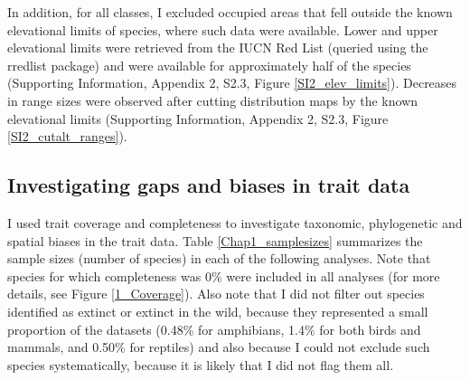 In addition, for all classes, I excluded occupied areas that fell outside the known elevational limits of species, where such data were available. Lower and upper elevational limits were retrieved from the IUCN Red List (queried using the rredlist package) and were available for approximately half of the species (Supporting Information, Appendix 2, S2.3, Figure \ref{SI2_elev_limits}). Decreases in range sizes were observed after cutting distribution maps by the known elevational limits (Supporting Information, Appendix 2, S2.3, Figure \ref{SI2_cutalt_ranges}).

\subsection{Investigating gaps and biases in trait data}

I used trait coverage and completeness to investigate taxonomic, phylogenetic and spatial biases in the trait data. Table \ref{Chap1_samplesizes} summarizes the sample sizes (number of species) in each of the following analyses. Note that species for which completeness was 0\% were included in all analyses (for more details, see Figure \ref{1_Coverage}). Also note that I did not filter out species identified as extinct or extinct in the wild, because they represented a small proportion of the datasets (0.48\% for amphibians, 1.4\% for both birds and mammals, and 0.50\% for reptiles) and also because I could not exclude such species systematically, because it is likely that I did not flag them all.

\vskip 0.5cm

